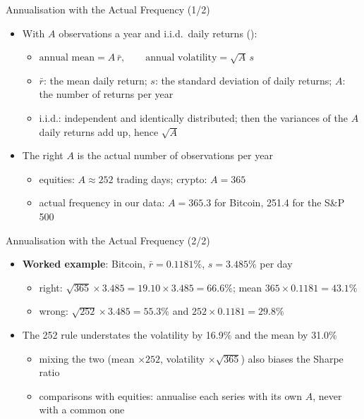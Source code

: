 \begin{frame}{Annualisation with the Actual Frequency (1/2)}
\itemsize{\small}
\begin{itemize}
    \item With $A$ observations a year and i.i.d.\ daily returns ():
    \begin{itemize}
        \item $\text{annual mean} = A\,\bar r, \qquad \text{annual volatility} = \sqrt{A}\,s$
        \item $\bar r$: the mean daily return; $s$: the standard deviation of daily returns; $A$: the number of returns per year
        \item i.i.d.: independent and identically distributed; then the variances of the $A$ daily returns add up, hence $\sqrt{A}$
    \end{itemize}
    \item The right $A$ is the actual number of observations per year
    \begin{itemize}
        \item equities: $A \approx 252$ trading days; crypto: $A = 365$
        \item actual frequency in our data: $A = 365.3$ for Bitcoin, 251.4 for the S\&P 500
    \end{itemize}
\end{itemize}
\end{frame}

\begin{frame}{Annualisation with the Actual Frequency (2/2)}
\itemsize{\small}
\begin{itemize}
    \item \textbf{Worked example}: Bitcoin, $\bar r = 0.1181\%$, $s = 3.485\%$ per day
    \begin{itemize}
        \item right: $\sqrt{365} \times 3.485 = 19.10 \times 3.485 = 66.6\%$; mean $365 \times 0.1181 = 43.1\%$
        \item wrong: $\sqrt{252} \times 3.485 = 55.3\%$ and $252 \times 0.1181 = 29.8\%$
    \end{itemize}
    \item The 252 rule understates the volatility by 16.9\% and the mean by 31.0\%
    \begin{itemize}
        \item mixing the two (mean $\times 252$, volatility $\times\sqrt{365}$) also biases the Sharpe ratio
        \item comparisons with equities: annualise each series with its own $A$, never with a common one
    \end{itemize}
\end{itemize}
\end{frame}

